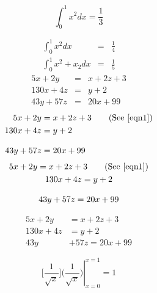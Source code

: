 \documentclass{book}
\begin{document}
\begin{equation}
	\int_{0}^{1} x^2 dx = \frac{1}{3}
\end{equation}

\begin{eqnarray}
    \int_{0}^{1} x^2 dx &=& \frac{1}{4} \label{eqn12} \\
    \int_{0}^{1} x^2+x_2 dx &=& \frac{1}{5}
\end{eqnarray}
\begin{eqnarray}
	5x+2y &=& x+2z+3 \label{eqn1}\\
	130x+4z &=& y+2 \nonumber \\
	43y+57z &=& 20x+99 \label{eqn3}
\end{eqnarray}
\begin{align}
	5x+2y   & = x+2z+3 \tag{See \eqref{eqn1}} \\
	130x+4z & = y+2 \label{align2}            \\[3mm]
	43y+57z & = 20x+99 \notag
\end{align}
\begin{multline}
	5x+2y   = x+2z+3 \tag{See \eqref{eqn1}} \\
	130x+4z = y+2 \label{align2}            \\[3mm]
	43y+57z = 20x+99 \notag
\end{multline}

\begin{equation}
	\begin{split}
		5x+2y   & = x+2z+3  \\
		130x+4z & = y+2	\\
		43y &+57z  = 20x+99
	\end{split}
\end{equation}

\begin{equation}
	\left. \biggl[ \frac{1}{\sqrt{x}} \biggr]
	\biggl( \frac{1}{\sqrt{x}} \biggr)\right|_{x = 0}^{x = 1}	= 1
\end{equation}
\end{document}
